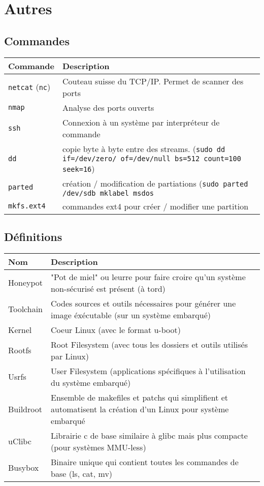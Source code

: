 \documentclass[resume]{subfiles}
\begin{document}
\section{Autres}
\subsection{Commandes}
\begin{table}[H]
\centering
\begin{tabular}{ll}
Commande & Description\\\hline
\verb!netcat! (\verb!nc!) & Couteau suisse du TCP/IP. Permet de scanner des ports\\
\verb!nmap! & Analyse des ports ouverts\\
\verb!ssh! & Connexion à un système par interpréteur de commande\\
\verb!dd! & copie byte à byte entre des streams. (\verb!sudo dd if=/dev/zero/ of=/dev/null bs=512 count=100 seek=16!)\\
\verb!parted! & création / modification de partiations (\verb!sudo parted /dev/sdb mklabel msdos!\\
\verb!mkfs.ext4! & commandes ext4 pour créer / modifier une partition
\end{tabular}
\end{table}

\subsection{Définitions}
\begin{table}[H]
\begin{tabular}{ll}
Nom & Description\\\hline
Honeypot & "Pot de miel" ou leurre pour faire croire qu'un système non-sécurisé est présent (à tord)\\
Toolchain & Codes sources et outils nécessaires pour générer une image éxécutable (sur un système embarqué)\\
Kernel & Coeur Linux (avec le format u-boot)\\
Rootfs & Root Filesystem (avec tous les dossiers et outils utilisés par Linux)\\
Usrfs & User Filesystem (applications spécifiques à l'utilisation du système embarqué)\\
Buildroot & Ensemble de makefiles et patchs qui simplifient et automatisent la création d'un Linux pour système embarqué\\
uClibc & Librairie c de base similaire à glibc mais plus compacte (pour systèmes MMU-less)\\
Busybox & Binaire unique qui contient toutes les commandes de base (ls, cat, mv)
\end{tabular}
\end{table}
\end{document}
